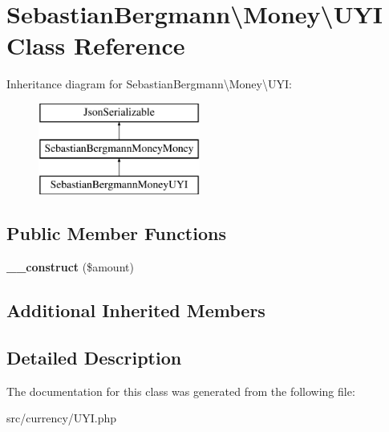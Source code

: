 \hypertarget{classSebastianBergmann_1_1Money_1_1UYI}{}\section{Sebastian\+Bergmann\textbackslash{}Money\textbackslash{}U\+Y\+I Class Reference}
\label{classSebastianBergmann_1_1Money_1_1UYI}
Inheritance diagram for Sebastian\+Bergmann\textbackslash{}Money\textbackslash{}U\+Y\+I\+:\begin{figure}[H]
\begin{center}
\leavevmode
\includegraphics[height=3.000000cm]{classSebastianBergmann_1_1Money_1_1UYI}
\end{center}
\end{figure}
\subsection*{Public Member Functions}
\begin{DoxyCompactItemize}
\item 
\hypertarget{classSebastianBergmann_1_1Money_1_1UYI_a38dfe6f39a850310e0d6c18cb7831796}{}{\bfseries \+\_\+\+\_\+construct} (\$amount)\label{classSebastianBergmann_1_1Money_1_1UYI_a38dfe6f39a850310e0d6c18cb7831796}

\end{DoxyCompactItemize}
\subsection*{Additional Inherited Members}


\subsection{Detailed Description}


The documentation for this class was generated from the following file\+:\begin{DoxyCompactItemize}
\item 
src/currency/U\+Y\+I.\+php\end{DoxyCompactItemize}
